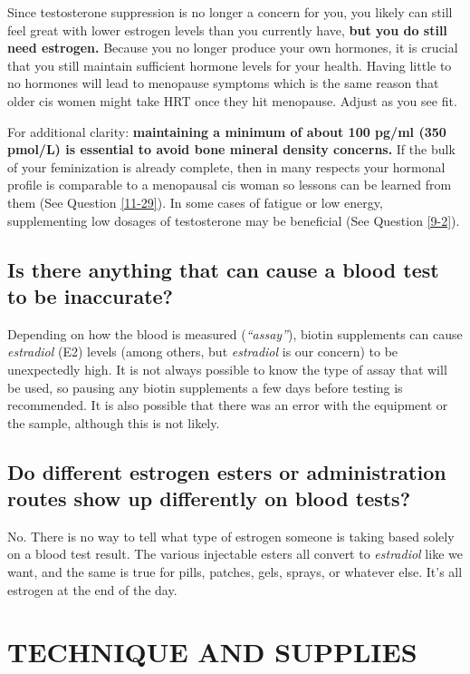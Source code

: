 \documentclass{article}
\begin{document}
Since testosterone suppression is no longer a concern for you, you likely can still feel great with lower estrogen levels than you currently have, \textbf{but you do still need estrogen.} Because you no longer produce your own hormones, it is crucial that you still maintain sufficient hormone levels for your health. Having little to no hormones will lead to menopause symptoms which is the same reason that older cis women might take HRT once they hit menopause. Adjust as you see fit.

For additional clarity: \textbf{maintaining a minimum of about 100 pg/ml (350 pmol/L) is essential to avoid bone mineral density concerns.} If the bulk of your feminization is already complete, then in many respects your hormonal profile is comparable to a menopausal cis woman so lessons can be learned from them (See Question \ref{11-29}). In some cases of fatigue or low energy, supplementing low dosages of testosterone may be beneficial (See Question \ref{9-2}).

\subsection{Is there anything that can cause a blood test to be inaccurate?}

Depending on how the blood is measured (\textit{“assay”}), biotin supplements can cause \textit{estradiol} (E2) levels (among others, but \textit{estradiol }is our concern) to be unexpectedly high. It is not always possible to know the type of assay that will be used, so pausing any biotin supplements a few days before testing is recommended. It is also possible that there was an error with the equipment or the sample, although this is not likely.

\subsection{Do different estrogen esters or administration routes show up differently on blood tests?}\label{4-16}

No. There is no way to tell what type of estrogen someone is taking based solely on a blood test result. The various injectable esters all convert to \textit{estradiol }like we want, and the same is true for pills, patches, gels, sprays, or whatever else. It's all estrogen at the end of the day.

 

\section{TECHNIQUE AND SUPPLIES}\label{ts}
\end{document}
